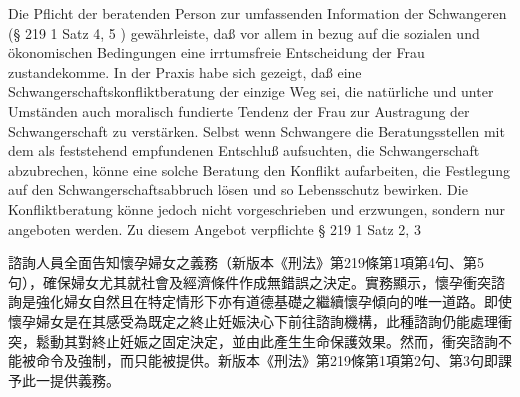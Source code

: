 \documentclass[12pt]{article}
\begin{document}
\begin{sourcepara}[title={原文C.25}]
Die Pflicht der beratenden Person zur umfassenden Information der Schwangeren (§ 219 \abbrAbs{} 1 Satz 4, 5 \abbrStGB{} \abbrNF{}) gewährleiste, daß vor allem in bezug auf die sozialen und ökonomischen Bedingungen eine irrtumsfreie Entscheidung der Frau zustandekomme. In der Praxis habe sich gezeigt, daß eine Schwangerschaftskonfliktberatung der einzige Weg sei, die natürliche und unter Umständen auch moralisch fundierte Tendenz der Frau zur Austragung der Schwangerschaft zu verstärken. Selbst wenn Schwangere die Beratungsstellen mit dem als feststehend empfundenen Entschluß aufsuchten, die Schwangerschaft abzubrechen, könne eine solche Beratung den Konflikt aufarbeiten, die Festlegung auf den Schwangerschaftsabbruch lösen und so Lebensschutz bewirken. Die Konfliktberatung könne jedoch nicht vorgeschrieben und erzwungen, sondern nur angeboten werden. Zu diesem Angebot verpflichte § 219 \abbrAbs{} 1 Satz 2, 3 \abbrStGB{} \abbrNF{}
\end{sourcepara}
\begin{transpara}
諮詢人員全面告知懷孕婦女之義務（新版本《刑法》第219條第1項第4句、第5句），確保婦女尤其就社會及經濟條件作成無錯誤之決定。實務顯示，懷孕衝突諮詢是強化婦女自然且在特定情形下亦有道德基礎之繼續懷孕傾向的唯一道路。即使懷孕婦女是在其感受為既定之終止妊娠決心下前往諮詢機構，此種諮詢仍能處理衝突，鬆動其對終止妊娠之固定決定，並由此產生生命保護效果。然而，衝突諮詢不能被命令及強制，而只能被提供。新版本《刑法》第219條第1項第2句、第3句即課予此一提供義務。
\end{transpara}
\end{document}
